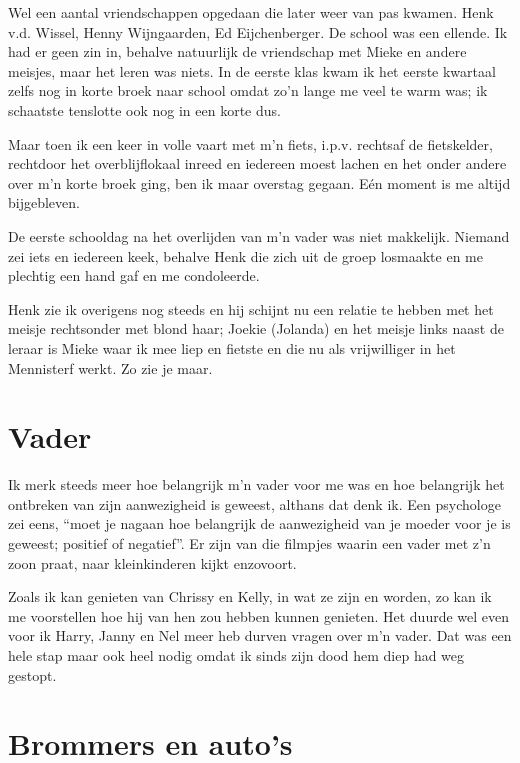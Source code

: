 \documentclass[10pt,twoside,openright]{memoir}
\begin{document}
Wel een aantal vriendschappen opgedaan die later weer van pas kwamen. Henk v.d. Wissel, Henny Wijngaarden, Ed Eijchenberger. De school was een ellende. Ik had er geen zin in, behalve natuurlijk de vriendschap met Mieke en andere meisjes, maar het leren was niets. In de eerste klas kwam ik het eerste kwartaal zelfs nog in korte broek naar school omdat zo’n lange me veel te warm was; ik schaatste tenslotte ook nog in een korte dus. 

Maar toen ik een keer in volle vaart met m’n fiets, i.p.v. rechtsaf de fietskelder, rechtdoor het overblijflokaal inreed en iedereen moest lachen en het onder andere over m’n korte broek ging, ben ik maar overstag gegaan. Eén moment is me altijd bijgebleven. 

De eerste schooldag na het overlijden van m’n vader was niet makkelijk. Niemand zei iets en iedereen keek, behalve Henk die zich uit de groep losmaakte en me plechtig een hand gaf en me condoleerde. 

Henk zie ik overigens nog steeds en hij schijnt nu een relatie te hebben met het meisje rechtsonder met blond haar; Joekie (Jolanda) en het meisje links naast de leraar is Mieke waar ik mee liep en fietste en die nu als vrijwilliger in het Mennisterf werkt. Zo zie je maar.

\chapter{Vader} %
\label{cha:vader}

Ik merk steeds meer hoe belangrijk m'n vader voor me was en hoe belangrijk het ontbreken van zijn aanwezigheid is geweest, althans dat denk ik. Een psychologe zei eens, ``moet je nagaan hoe belangrijk de aanwezigheid van je moeder voor je is geweest; positief of negatief''. Er zijn van die filmpjes waarin een vader met z'n zoon praat, naar kleinkinderen kijkt enzovoort.

Zoals ik kan genieten van Chrissy en Kelly, in wat ze zijn en worden, zo kan ik me voorstellen hoe hij van hen zou hebben kunnen genieten. Het duurde wel even voor ik Harry, Janny en Nel meer heb durven vragen over m'n vader. Dat was een hele stap maar ook heel nodig omdat ik sinds zijn dood hem diep had weg gestopt. 

\chapter{Brommers en auto's} %
\label{cha:brommers_autos}
\end{document}
